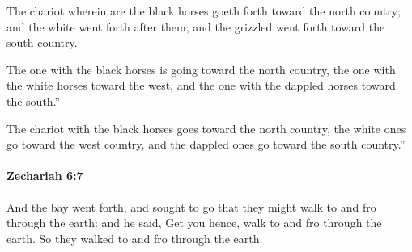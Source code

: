 			\begin{versebox}
					\item[BHS] 
					\item[LXX] 
					\item[ASV] The chariot wherein are the black horses goeth forth toward the north country; and the white went forth after them; and the grizzled went forth toward the south country.
					\item[NIV] The one with the black horses is going toward the north country, the one with the white horses toward the west, and the one with the dappled horses toward the south.”
					\item[NRSV] The chariot with the black horses goes toward the north country, the white ones go toward the west country, and the dappled ones go toward the south country.”
			\end{versebox}

		\paragraph{Zechariah 6:7} %
			\label{ZECHARIAH-6-7}

			And the bay went forth, and sought to go that they might walk to and fro through the earth: and he said, Get you hence, walk to and fro through the earth. So they walked to and fro through the earth.

